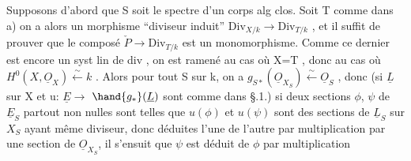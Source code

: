 Supposons d'abord que S soit le spectre d'un corps  alg clos. 
Soit T comme dans a) on a alors un morphisme ``diviseur induit''
$\mathrm{Div}_{X/k} \longrightarrow \mathrm{Div}_{T/k}$ , et il suffit de prouver que le composé $\check{P} \longrightarrow \mathrm{Div}_{T/k}$
est un monomorphisme. Comme ce dernier est encore un syst lin de div ,
on est ramené au cas où X=T , donc au cas où $H^0(X,\underline{O}_X) \xleftarrow{\sim} k$ . Alors pour
tout S sur k, on a $g_{S*}(\underline{O}_{X_S}) \xleftarrow{\sim} \underline{O}_S$ , donc (si $\underline{L}$ sur X et u: $\underline{E} \to$ $\hand{g_*}(\underline{L})$
sont comme dans §.1.) si deux sections $\phi$, $\psi$ de $\underline{E}_S$ partout non nulles
sont telles que $u(\phi)$ et $u(\psi)$ sont des sections de $\underline{L}_S$ sur $X_S$ ayant même
diviseur, donc  déduites l'une de l'autre par multiplication par
une section  de $\underline{O}_{X_S}$, il s'ensuit que $\psi$ est déduit de $\phi$ par multiplication

